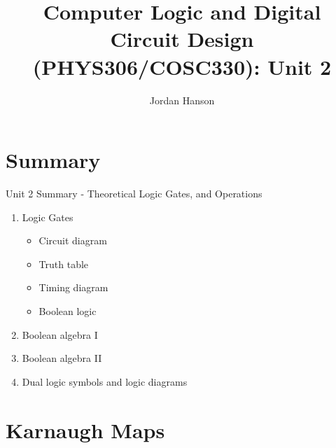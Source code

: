 \documentclass{beamer}
\title{Computer Logic and Digital Circuit Design (PHYS306/COSC330): Unit 2}
\author{Jordan Hanson}
\institute{Whittier College Department of Physics and Astronomy}
\begin{document}
\maketitle

\section{Summary}

\begin{frame}{Unit 2 Summary - Theoretical Logic Gates, and Operations}
\begin{enumerate}
\item Logic Gates
\begin{itemize}
\item Circuit diagram
\item Truth table
\item Timing diagram
\item Boolean logic
\end{itemize}
\item \alert{Boolean algebra I}
\item \alert{Boolean algebra II}
\item Dual logic symbols and logic diagrams
\end{enumerate}
\end{frame}

\section{Karnaugh Maps}
\end{document}
